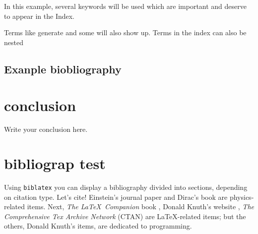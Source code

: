\documentclass[a4paper, 12pt, oneside, times, print, NoDraft]{template/UBtemplate}
\begin{document}
In this example, several keywords will be 
used which are important and deserve to appear in the 
Index.

Terms like generate and some 
will also show up. Terms in the index can also be 
nested 


\section{Exanple biobliography}


\chapter{conclusion}

Write your conclusion here.

\chapter{bibliograp test}

Using \texttt{biblatex} you can display a bibliography divided into sections, depending on citation type. 
Let's cite! Einstein's journal paper \cite{einstein} and Dirac's book \cite{dirac} are physics-related items. 
Next, \textit{The \LaTeX\ Companion} book \cite{latexcompanion}, Donald Knuth's website \cite{knuthwebsite}, \textit{The Comprehensive Tex Archive Network} (CTAN) \cite{ctan} are \LaTeX-related items; but the others, Donald Knuth's items, \cite{knuth-fa,knuth-acp} are dedicated to programming.













\end{document}

